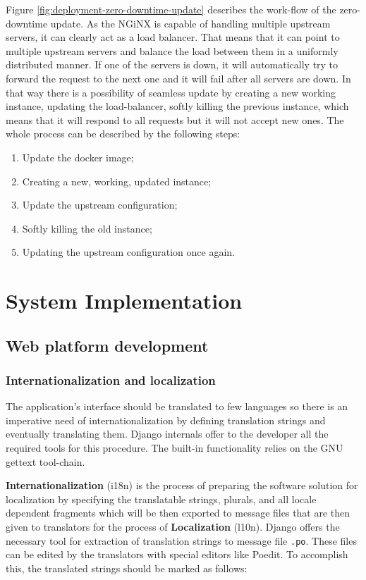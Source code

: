 \documentclass[12pt,oneside,a4paper]{article}
\begin{document}
Figure \ref{fig:deployment-zero-downtime-update} describes the work-flow of the zero-downtime update. As the NGiNX is capable of handling multiple upstream servers, it can clearly act as a load balancer. That means that it can point to multiple upstream servers and balance the load between them in a uniformly distributed manner. If one of the servers is down, it will automatically try to forward the request to the next one and it will fail after all servers are down. In that way there is a possibility of seamless update by creating a new working instance, updating the load-balancer, softly killing the previous instance, which means that it will respond to all requests but it will not accept new ones. The whole process can be described by the following steps:
\begin{enumerate}
  \item Update the docker image;
  \item Creating a new, working, updated instance; 
  \item Update the upstream configuration;
  \item Softly killing the old instance;
  \item Updating the upstream configuration once again.
\end{enumerate}

\newpage
\section{System Implementation}
\subsection{Web platform development}
\subsubsection{Internationalization and localization}
The application's interface should be translated to few languages so there is an imperative need of internationalization by defining translation strings and eventually translating them. Django internals offer to the developer all the required tools for this procedure. The built-in functionality relies on the GNU gettext tool-chain.

\textbf{Internationalization} (i18n) is the process of preparing the software solution for localization by specifying the translatable strings, plurals, and all locale dependent fragments which will be then exported to message files that are then given to translators for the process of \textbf{Localization} (l10n). Django offers the necessary tool for extraction of translation strings to message file \texttt{.po}. These files can be edited by the translators with special editors like Poedit. To accomplish this, the translated strings should be marked as follows:
\inputminted[linenos,baselinestretch=1,xleftmargin=0.5cm]{python}{src/i18n-1.py}
\end{document}
